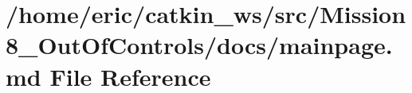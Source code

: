 \hypertarget{Mission8__OutOfControls_2docs_2mainpage_8md}{}\section{/home/eric/catkin\+\_\+ws/src/\+Mission8\+\_\+\+Out\+Of\+Controls/docs/mainpage.md File Reference}
\label{Mission8__OutOfControls_2docs_2mainpage_8md}
